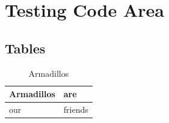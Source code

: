 \chapter*{Testing Code Area}
\section*{Tables}
\begin{table}[H]
	\caption{Armadillos}
	\label{arm:table}
	\begin{center}
		\begin{tabular}{||l|l||}\hline
			Armadillos & are \\\hline
			our	   & friends \\\hline
		\end{tabular}
	\end{center}
\end{table}
